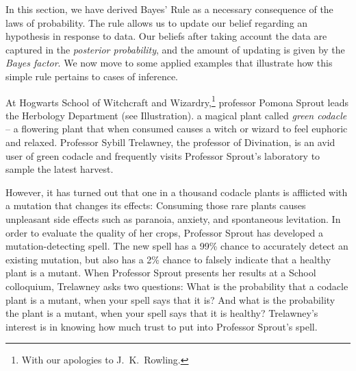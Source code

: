 In this section, we have derived Bayes' Rule as a necessary consequence of the laws of probability. The rule allows us to update our belief regarding an hypothesis in response to data. Our beliefs after taking account the data are captured in the \emph{posterior probability}, and the amount of updating is given by the \emph{Bayes factor}.  We now move to some applied examples that illustrate how this simple rule pertains to cases of inference. 

 At Hogwarts School of Witchcraft and Wizardry,\footnote{With our apologies to J.\ K.\ Rowling.} professor Pomona Sprout leads the Herbology Department {(see Illustration)}.  a magical plant called \emph{green codacle} -- a flowering plant that when consumed causes a witch or wizard to feel euphoric and relaxed. {Professor Sybill Trelawney, the professor of Divination, is an avid user of green codacle and frequently visits Professor Sprout's laboratory to sample the latest harvest.} 

{However, it has turned out that one in a thousand codacle plants is afflicted with a mutation that changes its effects: Consuming those rare plants causes unpleasant side effects such as paranoia, anxiety, and spontaneous levitation. In order to evaluate the quality of her crops, Professor Sprout has developed a mutation-detecting spell. The new spell has a 99\% chance to} accurately detect an existing mutation, but  also {has a 2\% chance to} falsely indicate that a healthy plant is a mutant.  When {Professor} Sprout presents her results at a School colloquium,  Trelawney asks two questions: What is the probability that a codacle plant is a mutant, when your spell says that it is? And what is the probability the plant is a mutant, when your spell says that it is healthy?  Trelawney's interest is in knowing how much trust to put into Professor Sprout's spell.

